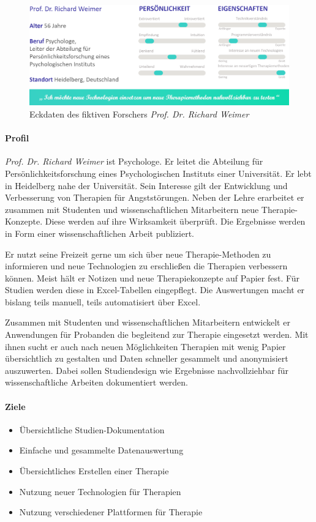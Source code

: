 \begin{figure}[h]
\centering
\includegraphics[width=1\textwidth]{pictures/forscher}
\caption{Eckdaten des fiktiven Forschers \emph{Prof. Dr. Richard Weimer}}
\label{forscher}
\end{figure}

\paragraph{Profil} 
\emph{Prof. Dr. Richard Weimer} ist Psychologe. Er leitet die Abteilung für Persönlichkeitsforschung eines Psychologischen Instituts einer Universität. Er lebt in Heidelberg nahe der Universität. Sein Interesse gilt der Entwicklung und Verbesserung von Therapien für Angststörungen. Neben der Lehre erarbeitet er zusammen mit Studenten und wissenschaftlichen Mitarbeitern neue Therapie-Konzepte. Diese werden auf ihre Wirksamkeit überprüft. Die Ergebnisse werden in Form einer wissenschaftlichen Arbeit publiziert.

Er nutzt seine Freizeit gerne um sich über neue Therapie-Methoden zu informieren und neue Technologien zu erschließen die Therapien verbessern können. Meist hält er Notizen und neue Therapiekonzepte auf Papier fest. Für Studien werden diese in Excel-Tabellen eingepflegt. Die Auswertungen macht er bislang teils manuell, teils automatisiert über Excel.

Zusammen mit Studenten und wissenschaftlichen Mitarbeitern entwickelt er Anwendungen für Probanden die begleitend zur Therapie eingesetzt werden. Mit ihnen sucht er auch nach neuen Möglichkeiten Therapien mit wenig Papier übersichtlich zu gestalten und Daten schneller gesammelt und anonymisiert auszuwerten. Dabei sollen Studiendesign wie Ergebnisse nachvollziehbar für wissenschaftliche Arbeiten dokumentiert werden.


\paragraph{Ziele}
\begin{itemize}
\item Übersichtliche Studien-Dokumentation
\item Einfache und gesammelte Datenauswertung
\item Übersichtliches Erstellen einer Therapie
\item Nutzung neuer Technologien für Therapien
\item Nutzung verschiedener Plattformen für Therapie 
\end{itemize}


